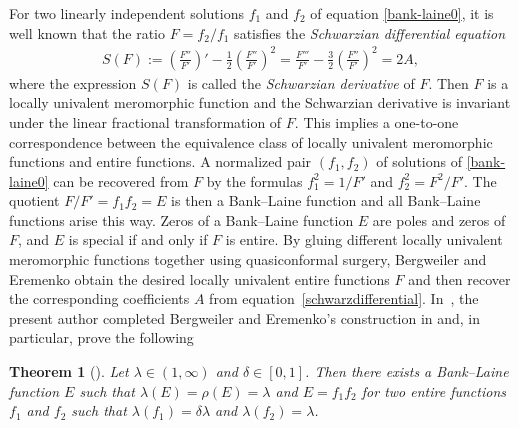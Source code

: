 \documentclass[12pt]{amsart}
\numberwithin{equation}{section}
\newtheorem{theorem}{Theorem}[section]
\begin{document}
For two linearly independent solutions $f_1$ and $f_2$ of equation \eqref{bank-laine0}, it is well known that the ratio $F=f_2/f_1$ satisfies the \emph{Schwarzian differential equation}
\begin{equation}\label{schwarzdifferential}
\begin{split}
S(F):=\left(\frac{F''}{F'}\right)'-\frac{1}{2}\left(\frac{F''}{F'}\right)^2=\frac{F'''}{F'}-\frac{3}{2}\left(\frac{F''}{F'}\right)^2=2A,
\end{split}
\end{equation}
where the expression $S(F)$ is called the \emph{Schwarzian derivative} of $F$. Then $F$ is a locally univalent meromorphic function and the Schwarzian derivative is invariant under the linear fractional transformation of $F$. This implies a one-to-one correspondence between the equivalence class of locally univalent meromorphic functions and entire functions. A normalized pair $(f_1,f_2)$ of solutions of \eqref{bank-laine0} can be recovered from $F$ by the formulas $f_1^2=1/F'$ and $f_2^2=F^2/F'$. The quotient $F/F'=f_1f_2=E$ is then a Bank--Laine function and all Bank--Laine functions arise this way. Zeros of a Bank--Laine function $E$ are poles and zeros of $F$, and $E$ is special if and only if $F$ is entire. By gluing different locally univalent meromorphic functions together using quasiconformal surgery, Bergweiler and Eremenko obtain the desired locally univalent entire functions $F$ and then recover the corresponding coefficients $A$ from equation~\eqref{schwarzdifferential}. In~\cite{Zhang2024}, the present author completed Bergweiler and Eremenko's construction in \cite{Bergweilereremenko2019} and, in particular, prove the following

\begin{theorem}[\cite{Zhang2024}]\label{maintheorem2}
Let $\lambda\in(1,\infty)$ and $\delta\in[0,1]$. Then there exists a Bank--Laine function $E$ such that $\lambda(E)=\rho(E)=\lambda$ and $E=f_1f_2$ for two entire functions $f_1$ and $f_2$ such that $\lambda(f_1)=\delta\lambda$ and $\lambda(f_2)=\lambda$.
\end{theorem}
\end{document}
